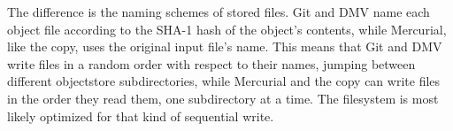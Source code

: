 The difference is the naming schemes of stored files.
Git and DMV name each object file according to the SHA-1 hash of the object's contents, while Mercurial, like the copy, uses the original input file's name.
This means that Git and DMV write files in a random order with respect to their names, jumping between different \gls{objectstore} subdirectories, while Mercurial and the copy can write files in the order they read them, one subdirectory at a time.
The filesystem is most likely optimized for that kind of sequential write.
